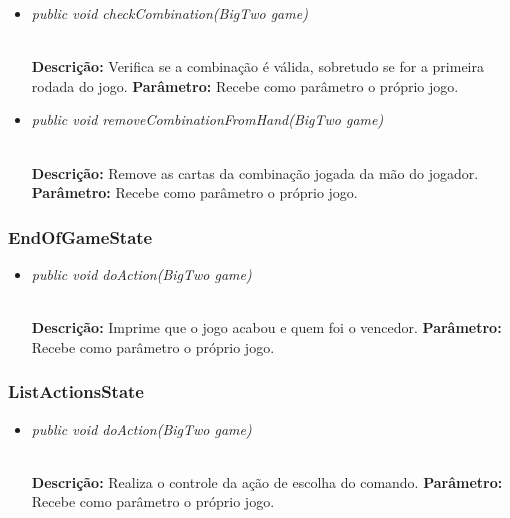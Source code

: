 \documentclass[12pt]{article}
\begin{document}
\vspace{0.2 true cm}

\begin{itemize}
\item \begin{large}\textit{public void checkCombination(BigTwo game)}\end{large}\\
\subitem \textbf{Descrição:} Verifica se a combinação é válida, sobretudo se for a primeira rodada do jogo.
\subitem \textbf{Parâmetro:} Recebe como parâmetro o próprio jogo.
\end{itemize}

\vspace{0.2 true cm}

\begin{itemize}
\item \begin{large}\textit{public void removeCombinationFromHand(BigTwo game)}\end{large}\\
\subitem \textbf{Descrição:} Remove as cartas da combinação jogada da mão do jogador.
\subitem \textbf{Parâmetro:} Recebe como parâmetro o próprio jogo.
\end{itemize}

\vspace{0.2 true cm}

\subsubsection{EndOfGameState}

\begin{itemize}
\item \begin{large}\textit{public void doAction(BigTwo game)}\end{large}\\
\subitem \textbf{Descrição:} Imprime que o jogo acabou e quem foi o vencedor.
\subitem \textbf{Parâmetro:} Recebe como parâmetro o próprio jogo.
\end{itemize}

\vspace{0.2 true cm}

\subsubsection{ListActionsState}

\begin{itemize}
\item \begin{large}\textit{public void doAction(BigTwo game)}\end{large}\\
\subitem \textbf{Descrição:} Realiza o controle da ação de escolha do comando.
\subitem \textbf{Parâmetro:} Recebe como parâmetro o próprio jogo.
\end{itemize}
\end{document}

